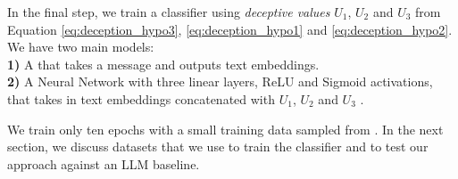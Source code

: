 In the final step, we train a classifier using \textit{deceptive values} \( U_1\), \( U_2\) and \( U_3\) from Equation \ref{eq:deception_hypo3}, \ref{eq:deception_hypo1} and \ref{eq:deception_hypo2}. We have two main models:\\
\noindent \textbf{1)} A  that takes a message and outputs text embeddings.\\
\noindent \textbf{2)} A Neural Network with three linear layers, ReLU  and Sigmoid activations, that takes in text embeddings concatenated with \( U_1\), \( U_2\) and \( U_3\) .

We train only ten epochs with a small training data sampled from \citet{peskov2020takes}. In the next section, we discuss datasets that we use to train the classifier and to test our approach against an LLM baseline.
